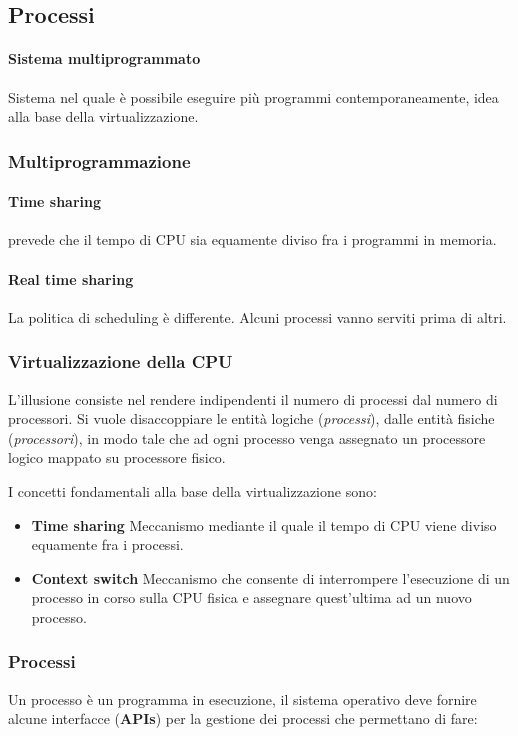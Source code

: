 \documentclass[12pt, letterpaper]{article}
\begin{document}
		\subsection{Processi}
			
			\paragraph{Sistema multiprogrammato} Sistema nel quale è possibile eseguire più programmi contemporaneamente, idea alla base della virtualizzazione.
			
			\subsubsection{Multiprogrammazione}
				
				\paragraph{Time sharing} prevede che il tempo di CPU sia equamente diviso fra i programmi in memoria. 
				\paragraph{Real time sharing} La politica di scheduling è differente. Alcuni processi vanno serviti prima di altri.
				
			\subsubsection{Virtualizzazione della CPU}
				L'illusione consiste nel rendere indipendenti il numero di processi dal numero di processori. Si vuole disaccoppiare le entità logiche (\textit{processi}), dalle entità fisiche (\textit{processori}), in modo tale che ad ogni processo venga assegnato un processore logico mappato su processore fisico.
				
				I concetti fondamentali alla base della virtualizzazione sono: 
				\begin{itemize}
					\item \textbf{Time sharing} Meccanismo mediante il quale il tempo di CPU viene diviso equamente fra i processi.
					\item \textbf{Context switch} Meccanismo che consente di interrompere l'esecuzione di un processo in corso sulla CPU fisica e assegnare quest'ultima ad un nuovo processo.
				\end{itemize}				 
				
			\subsubsection{Processi} Un processo è un programma in esecuzione, il sistema operativo deve fornire alcune interfacce (\textbf{APIs}) per la gestione dei processi che permettano di fare:
			
\end{document}
